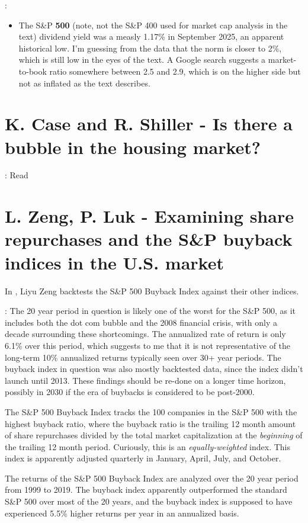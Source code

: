 \documentclass{article}
\begin{document}
\note{[Consider]}:
\begin{itemize}
    \item The S\&P {\bf 500} (note, not the S\&P 400 used for market cap analysis in the text) dividend yield was a measly 1.17\% in September 2025, an apparent historical low.  I'm guessing from the data that the norm is closer to 2\%, which is still low in the eyes of the text.  A Google search suggests a market-to-book ratio somewhere between 2.5 and 2.9, which is on the higher side but not as inflated as the text describes.  
\end{itemize}


\section{K. Case and R. Shiller - Is there a bubble in the housing market?}

\note{[Todo]}: Read \cite{Case2003}


\section{L. Zeng, P. Luk - Examining share repurchases and the S\&P buyback indices in the U.S. market}

In \cite{Zeng2020}, Liyu Zeng backtests the S\&P 500 Buyback Index against their other indices.

\note{[Caution]}: The 20 year period in question is likely one of the worst for the S\&P 500, as it includes both the dot com bubble and the 2008 financial crisis, with only a decade surrounding these shortcomings.  The annualized rate of return is only 6.1\% over this period, which suggests to me that it is not representative of the long-term 10\% annualized returns typically seen over 30+ year periods.  The buyback index in question was also mostly backtested data, since the index didn't launch until 2013.  These findings should be re-done on a longer time horizon, possibly in 2030 if the era of buybacks is considered to be post-2000.

The S\&P 500 Buyback Index tracks the 100 companies in the S\&P 500 with the highest buyback ratio, where the buyback ratio is the trailing 12 month amount of share repurchases divided by the total market capitalization at the {\it beginning} of the trailing 12 month period.  Curiously, this is an {\it equally-weighted} index.  This index is apparently adjusted quarterly in January, April, July, and October.

The returns of the S\&P 500 Buyback Index are analyzed over the 20 year period from 1999 to 2019.  The buyback index apparently outperformed the standard S\&P 500 over most of the 20 years, and the buyback index is supposed to have experienced 5.5\% higher returns per year in an annualized basis.
\end{document}
